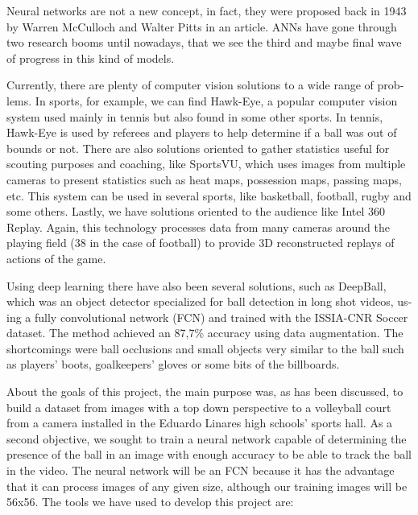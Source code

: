 \begin{otherlanguage}{english}
Neural networks are not a new concept, in fact, they were proposed back in 1943 by Warren McCulloch and Walter Pitts in an article. ANNs have gone through two research booms until nowadays, that we see the third and maybe final wave of progress in this kind of models.

Currently, there are plenty of computer vision solutions to a wide range of problems. In sports, for example, we can find Hawk-Eye, a popular computer vision system used mainly in tennis but also found in some other sports. In tennis, Hawk-Eye is used by referees and players to help determine if a ball was out of bounds or not. There are also solutions oriented to gather statistics useful for scouting purposes and coaching, like SportsVU, which uses images from multiple cameras to present statistics such as heat maps, possession maps, passing maps, etc. This system can be used in several sports, like basketball, football, rugby and some others. Lastly, we have solutions oriented to the audience like Intel 360 Replay. Again, this technology processes data from many cameras around the playing field (38 in the case of football) to provide 3D reconstructed replays of actions of the game.

Using deep learning there have also been several solutions, such as DeepBall, which was an object detector specialized for ball detection in long shot videos, using a fully convolutional network (FCN) and trained with the ISSIA-CNR Soccer dataset. The method achieved an 87,7\% accuracy using data augmentation. The shortcomings were ball occlusions and small objects very similar to the ball such as players’ boots, goalkeepers’ gloves or some bits of the billboards.

About the goals of this project, the main purpose was, as has been discussed, to build a dataset from images with a top down perspective to a volleyball court from a camera installed in the Eduardo Linares high schools’ sports hall. As a second objective, we sought to train a neural network capable of determining the presence of the ball in an image with enough accuracy to be able to track the ball in the video. The neural network will be an FCN because it has the advantage that it can process images of any given size, although our training images will be 56x56.
The tools we have used to develop this project are: 


\end{otherlanguage}
